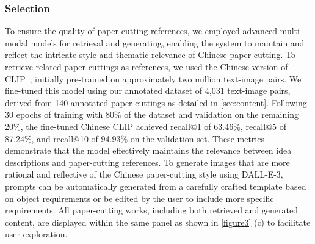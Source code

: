 \subsubsection{Selection} 
To ensure the quality of paper-cutting references, we employed advanced multi-modal models for retrieval and generating, enabling the system to maintain and reflect the intricate style and thematic relevance of Chinese paper-cutting.
To retrieve related paper-cuttings as references, we used the Chinese version of CLIP~\cite{Yang:2023:chineseclip, Radford:2021:clip}, initially pre-trained on approximately two million text-image pairs. We fine-tuned this model using our annotated dataset of 4,031 text-image pairs, derived from 140 annotated paper-cuttings as detailed in \autoref{sec:content}. Following 30 epochs of training with 80\% of the dataset and validation on the remaining 20\%, the fine-tuned Chinese CLIP achieved recall@1 of 63.46\%, recall@5 of 87.24\%, and recall@10 of 94.93\% on the validation set. These metrics demonstrate that the model effectively maintains the relevance between idea descriptions and paper-cutting references. 
To generate images that are more rational and reflective of the Chinese paper-cutting style using DALL-E-3, prompts can be automatically generated from a carefully crafted template based on object requirements or be edited by the user to include more specific requirements. All paper-cutting works, including both retrieved and generated content, are displayed within the same panel as shown in \autoref{figure3} (c) to facilitate user exploration.

